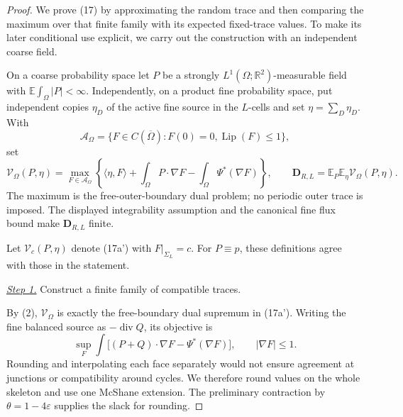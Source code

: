 \documentclass{smfart}
\theoremstyle{definition}
\newcommand{\1}{\mathbf 1}
\begin{document}
\begin{proof}
We prove (17) by approximating the random trace and then comparing the
maximum over that finite family with its expected fixed-trace values.
To make its later conditional use explicit, we carry out the construction
with an independent coarse field.

On a coarse probability space let $P$ be a strongly
$L^1(\Omega;\mathbb R^2)$-measurable field with
$\mathbb E\int_ \Omega|P|<\infty$.  Independently, on a product fine
probability space, put independent copies $\eta_ D$ of the active
fine source in the $L$-cells and set $\eta=\sum_ D\eta_ D$.  With
\begin{equation*}
\mathscr A_ \Omega=\{F\in C(\overline\Omega):F(0)=0,
\operatorname {Lip}(F)\leq1\},
\end{equation*}
set
\begin{equation}
\mathcal V_ \Omega(P,\eta)=
\max_ {F\in\mathscr A_ \Omega}
\left\{\langle\eta,F\rangle+
\int_ \Omega P\cdot\nabla F-
\int_ \Omega\Psi^*(\nabla F)\right\},\qquad
\mathbf D_ {R,L}=\mathbb E_ P\mathbb E_ \eta
\mathcal V_ \Omega(P,\eta).
\tag{17a'}
\end{equation}
The maximum is the free-outer-boundary dual problem; no periodic outer
trace is imposed.  The displayed integrability assumption and the
canonical fine flux bound make $\mathbf D_ {R,L}$ finite.

Let $\mathcal V_c(P,\eta)$ denote (17a') with
$F|_{\Sigma_L}=c$.  For $P\equiv p$, these definitions agree with
those in the statement.

\smallskip\noindent
\underline{\textit{Step 1.}} Construct a finite family of compatible traces.

By (2), $\mathcal V_ \Omega$ is exactly the free-boundary dual
supremum in (17a').
Writing the fine balanced source as $-\operatorname {div}Q$, its
objective is
\begin{equation}
\sup_ F\int\bigl[(P+Q)\cdot\nabla F-\Psi^*(\nabla F)\bigr],
\qquad |\nabla F|\leq1.
\tag{20}
\end{equation}
Rounding and interpolating each face separately would not ensure agreement
at junctions or compatibility around cycles.  We therefore round values
on the whole skeleton and use one McShane extension.  The preliminary
contraction by $\theta=1-4\varepsilon$ supplies the slack for rounding.


\end{proof}
\end{document}
